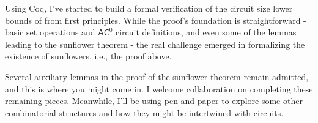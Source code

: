 \documentclass[a4, 12pt]{article}
\begin{document}
Using Coq, I've started to build a formal verification of the circuit size lower bounds of \cite{Hstad1995} from first principles. While the proof's foundation is straightforward - basic set operations and $\mathsf{AC}^0$ circuit definitions, and even some of the lemmas leading to the sunflower theorem - the real challenge emerged in formalizing the existence of sunflowers, i.e., the proof above. 

Several auxiliary lemmas in the proof of the sunflower theorem remain admitted, and this is where you might come in. I welcome collaboration on completing these remaining pieces. Meanwhile, I'll be using pen and paper to explore some other combinatorial structures and how they might be intertwined with circuits.


\end{document}

